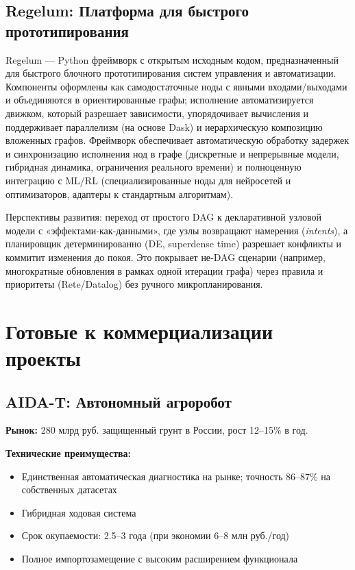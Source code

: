 \documentclass[12pt,a4paper]{article}
\begin{document}
\subsection{Regelum: Платформа для быстрого прототипирования}
Regelum — Python фреймворк с открытым исходным кодом, предназначенный для быстрого блочного прототипирования систем управления и автоматизации. Компоненты оформлены как самодостаточные ноды с явными входами/выходами и объединяются в ориентированные графы; исполнение автоматизируется движком, который разрешает зависимости, упорядочивает вычисления и поддерживает параллелизм (на основе Dask) и иерархическую композицию вложенных графов. Фреймворк обеспечивает автоматическую обработку задержек и синхронизацию исполнения нод в графе (дискретные и непрерывные модели, гибридная динамика, ограничения реального времени) и полноценную интеграцию с ML/RL (специализированные ноды для нейросетей и оптимизаторов, адаптеры к стандартным алгоритмам). 

Перспективы развития: переход от простого DAG к декларативной узловой модели с «эффектами‑как‑данными», где узлы возвращают намерения (\textit{intents}), а планировщик детерминированно (DE, superdense time) разрешает конфликты и коммитит изменения до покоя. Это покрывает не‑DAG сценарии (например, многократные обновления в рамках одной итерации графа) через правила и приоритеты (Rete/Datalog) без ручного микропланирования.

\section{Готовые к коммерциализации проекты}
\subsection{AIDA-T: Автономный агроробот}
\textbf{Рынок:} 280 млрд руб. защищенный грунт в России, рост 12–15\% в год.

\textbf{Технические преимущества:}
\begin{itemize}
    \item Единственная автоматическая диагностика на рынке; точность 86–87\% на собственных датасетах
    \item Гибридная ходовая система
    \item Срок окупаемости: 2.5–3 года (при экономии 6–8 млн руб./год)
    \item Полное импортозамещение с высоким расширением функционала
\end{itemize}
\end{document}
